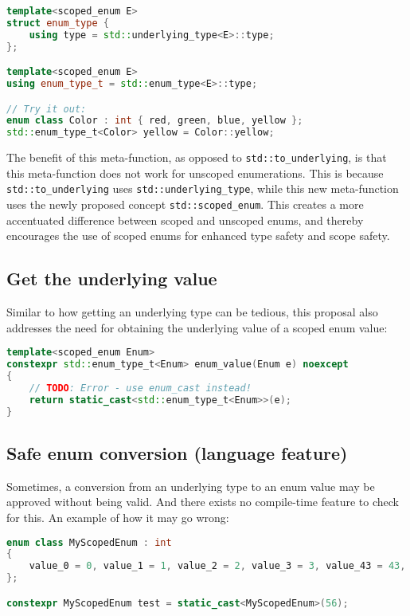 \documentclass[
  format=manuscript,
  screen=true,
  review=false,
  nonacm=true,
  timestamp=true,
  balance=false]{acmart}
\begin{document}
\begin{lstlisting}[language=Cpp]
template<scoped_enum E>
struct enum_type {
    using type = std::underlying_type<E>::type;
};

template<scoped_enum E>
using enum_type_t = std::enum_type<E>::type;

// Try it out:
enum class Color : int { red, green, blue, yellow };
std::enum_type_t<Color> yellow = Color::yellow;
\end{lstlisting}

The benefit of this meta-function, as opposed to \texttt{std::to\_underlying}, is
that this meta-function does not work for unscoped enumerations. This is because
\texttt{std::to\_underlying} uses \texttt{std::underlying\_type}, while this new
meta-function uses the newly proposed concept \texttt{std::scoped\_enum}.
This creates a more accentuated difference between scoped and unscoped enums, and
thereby encourages the use of scoped enums for enhanced type safety and scope
safety.


\subsection{Get the underlying value}

Similar to how getting an underlying type can be tedious, this proposal also
addresses the need for obtaining the underlying value of a scoped enum value:\vspace{2mm}

\begin{lstlisting}[language=Cpp]
template<scoped_enum Enum>
constexpr std::enum_type_t<Enum> enum_value(Enum e) noexcept
{
    // TODO: Error - use enum_cast instead!
    return static_cast<std::enum_type_t<Enum>>(e);
}
\end{lstlisting}


\subsection{Safe enum conversion (language feature)}

Sometimes, a conversion from an underlying type to an enum value may be approved
without being valid. And there exists no compile-time feature to check for this.
An example of how it may go wrong:\vspace{2mm}

\begin{lstlisting}[language=Cpp]
enum class MyScopedEnum : int
{
    value_0 = 0, value_1 = 1, value_2 = 2, value_3 = 3, value_43 = 43, value_57 = 57
};

constexpr MyScopedEnum test = static_cast<MyScopedEnum>(56);
\end{lstlisting}
\end{document}
